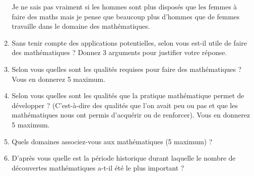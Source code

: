 \documentclass{article}
\begin{document}
\begin{enumerate}
    Je ne sais pas vraiment si les hommes sont plus disposés
    que les femmes à faire des maths mais je pense que beaucoup plus
    d'hommes que de femmes travaille dans le domaine des mathématiques. 
  \item Sans tenir compte des applications potentielles, selon vous est-il
    utile de faire des mathématiques ? Donnez 3 arguments pour justifier
    votre réponse.
  \item Selon vous quelles sont les qualités requises pour faire des
    mathématiques ? Vous en donnerez 5 maximum. 
  \item Selon vous quelles sont les qualités que la pratique
    mathématique permet de développer ? (C'est-à-dire des qualités que
    l'on avait peu ou pas et que les mathématiques nous ont permis
    d'acquérir ou de renforcer). Vous en donnerez 5 maximum. 
  \item Quels domaines associez-vous aux mathématiques (5 maximum) ?
  \item D'après vous quelle est la période historique durant laquelle le
    nombre de découvertes mathématiques a-t-il été le plus important ? 
    

\end{enumerate}
\end{document}

